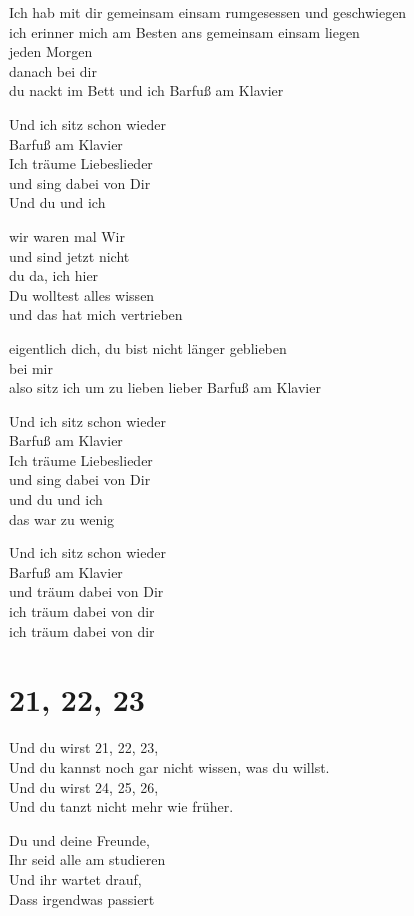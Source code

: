 \documentclass[]{book}
\begin{document}
Ich hab mit dir gemeinsam einsam rumgesessen und geschwiegen\\
ich erinner mich am Besten ans gemeinsam einsam liegen\\
jeden Morgen\\
danach bei dir\\
du nackt im Bett und ich Barfuß am Klavier

Und ich sitz schon wieder\\
Barfuß am Klavier\\
Ich träume Liebeslieder\\
und sing dabei von Dir\\
Und du und ich

wir waren mal Wir\\
und sind jetzt nicht\\
du da, ich hier\\
Du wolltest alles wissen\\
und das hat mich vertrieben

eigentlich dich, du bist nicht länger geblieben\\
bei mir\\
also sitz ich um zu lieben lieber Barfuß am Klavier

Und ich sitz schon wieder\\
Barfuß am Klavier\\
Ich träume Liebeslieder\\
und sing dabei von Dir\\
und du und ich\\
das war zu wenig

Und ich sitz schon wieder\\
Barfuß am Klavier\\
und träum dabei von Dir\\
ich träum dabei von dir\\
ich träum dabei von dir

\hypertarget{section-1}{%
\section{21, 22, 23}\label{section-1}}

Und du wirst 21, 22, 23,\\
Und du kannst noch gar nicht wissen, was du willst.\\
Und du wirst 24, 25, 26,\\
Und du tanzt nicht mehr wie früher.

Du und deine Freunde,\\
Ihr seid alle am studieren\\
Und ihr wartet drauf,\\
Dass irgendwas passiert
\end{document}
